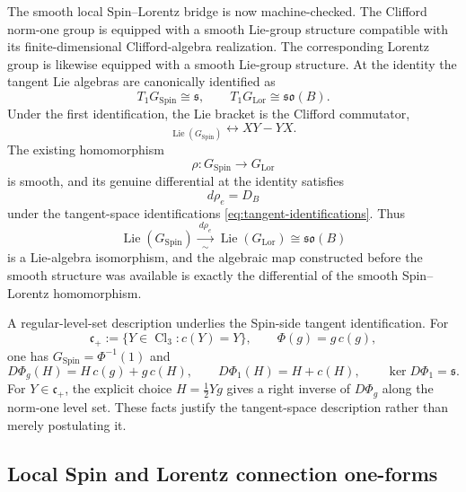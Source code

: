 \documentclass[11pt,a4paper]{article}
\theoremstyle{remark}
\newcommand{\Cl}{\operatorname{Cl}}
\newcommand{\SpinG}{G_{\mathrm{Spin}}}
\newcommand{\LorG}{G_{\mathrm{Lor}}}
\newcommand{\soB}{\mathfrak{so}(B)}
\begin{document}
The smooth local Spin--Lorentz bridge is now machine-checked.  The Clifford norm-one group is equipped with a smooth Lie-group structure compatible with its finite-dimensional Clifford-algebra realization.  The corresponding Lorentz group is likewise equipped with a smooth Lie-group structure.  At the identity the tangent Lie algebras are canonically identified as
\begin{equation}
  T_1\SpinG\cong\mathfrak s,
  \qquad
  T_1\LorG\cong\soB.
\tag{4.11}\label{eq:tangent-identifications}
\end{equation}
Under the first identification, the Lie bracket is the Clifford commutator,
\begin{equation}
  [X,Y]_{\operatorname{Lie}(\SpinG)}
  \longleftrightarrow
  XY-YX.
\tag{4.12}\label{eq:spin-bracket-commutator}
\end{equation}
The existing homomorphism
\[
  \rho:\SpinG\to\LorG
\]
is smooth, and its genuine differential at the identity satisfies
\begin{equation}
  \boxed{\;d\rho_e=D_B\;}
\tag{4.13}\label{eq:drho-equals-DB}
\end{equation}
under the tangent-space identifications \eqref{eq:tangent-identifications}.  Thus
\begin{equation}
  \operatorname{Lie}(\SpinG)
  \xrightarrow[\sim]{\ d\rho_e\ }
  \operatorname{Lie}(\LorG)
  \cong\soB
\tag{4.14}
\end{equation}
is a Lie-algebra isomorphism, and the algebraic map constructed before the smooth structure was available is exactly the differential of the smooth Spin--Lorentz homomorphism.

A regular-level-set description underlies the Spin-side tangent identification.  For
\[
  \mathfrak c_+:=\{Y\in\Cl_3:c(Y)=Y\},
  \qquad
  \Phi(g)=g\,c(g),
\]
one has \(\SpinG=\Phi^{-1}(1)\) and
\begin{equation}
  D\Phi_g(H)=H\,c(g)+g\,c(H),
  \qquad
  D\Phi_1(H)=H+c(H),
  \qquad
  \ker D\Phi_1=\mathfrak s.
\tag{4.15}
\end{equation}
For \(Y\in\mathfrak c_+\), the explicit choice \(H=\tfrac12Yg\) gives a right inverse of \(D\Phi_g\) along the norm-one level set.  These facts justify the tangent-space description rather than merely postulating it.

\subsection{Local Spin and Lorentz connection one-forms}
\end{document}
